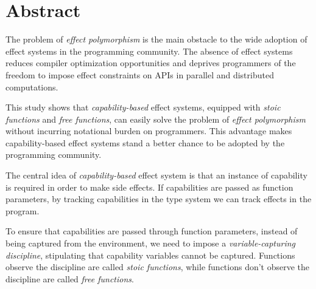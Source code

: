 \section*{\centering Abstract}

The problem of \emph{effect polymorphism} is the main obstacle to the
wide adoption of effect systems in the programming community. The
absence of effect systems reduces compiler optimization opportunities
and deprives programmers of the freedom to impose effect constraints
on APIs in parallel and distributed computations.

This study shows that \emph{capability-based} effect systems, equipped
with \emph{stoic functions} and \emph{free functions}, can easily
solve the problem of \emph{effect polymorphism} without incurring
notational burden on programmers. This advantage makes
capability-based effect systems stand a better chance to be adopted by
the programming community.

The central idea of \emph{capability-based} effect system is that an
instance of capability is required in order to make side effects. If
capabilities are passed as function parameters, by tracking
capabilities in the type system we can track effects in the program.

To ensure that capabilities are passed through function parameters,
instead of being captured from the environment, we need to impose a
\emph{variable-capturing discipline}, stipulating that capability
variables cannot be captured. Functions observe the discipline are
called \emph{stoic functions}, while functions don't observe the
discipline are called \emph{free functions}.
